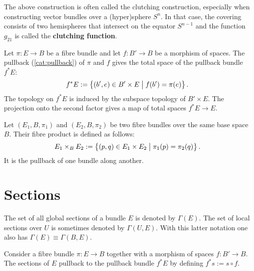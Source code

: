     \begin{remark}[Clutching]\label{bundle:clutching_theorem}
        The above construction is often called the clutching construction, especially when constructing vector bundles over a (hyper)sphere $S^n$. In that case, the covering consists of two hemispheres that intersect on the equator $S^{n-1}$ and the function $g_{21}$ is called the \textbf{clutching function}.
    \end{remark}

    \begin{construct}\label{bundle:pullback_bundle}
        Let $\pi:E\rightarrow B$ be a fibre bundle and let $f:B'\rightarrow B$ be a morphism of spaces. The pullback (\cref{cat:pullback}) of $\pi$ and $f$ gives the total space of the pullback bundle $f^*E$:
        \begin{gather}
            f^*E := \bigl\{(b',e)\in B'\times E\bigm\vert f(b') = \pi(e)\bigr\}\,.
        \end{gather}
        The topology on $f^*E$ is induced by the subspace topology of $B'\times E$. The projection onto the second factor gives a map of total spaces $f^*E\rightarrow E$.
    \end{construct}

    \begin{construct}\label{bundle:fibre_product}
        Let $(E_1,B,\pi_1)$ and $(E_2,B,\pi_2)$  be two fibre bundles over the same base space $B$. Their fibre product is defined as follows:
        \begin{gather}
            E_1\times_BE_2 := \bigl\{(p,q)\in E_1\times E_2\bigm\vert\pi_1(p) = \pi_2(q)\bigr\}\,.
        \end{gather}
        It is the pullback of one bundle along another.
    \end{construct}

\section{Sections}

    \begin{notation}
        The set of all global sections of a bundle $E$ is denoted by $\Gamma(E)$. The set of local sections over $U$ is sometimes denoted by $\Gamma(U,E)$. With this latter notation one also has $\Gamma(E)\equiv\Gamma(B,E)$.
    \end{notation}

    \begin{property}
        Consider a fibre bundle $\pi:E\rightarrow B$ together with a morphism of spaces $f:B'\rightarrow B$. The sections of $E$ pullback to the pullback bundle $f^*E$ by defining $f^*s := s\circ f$.
    \end{property}